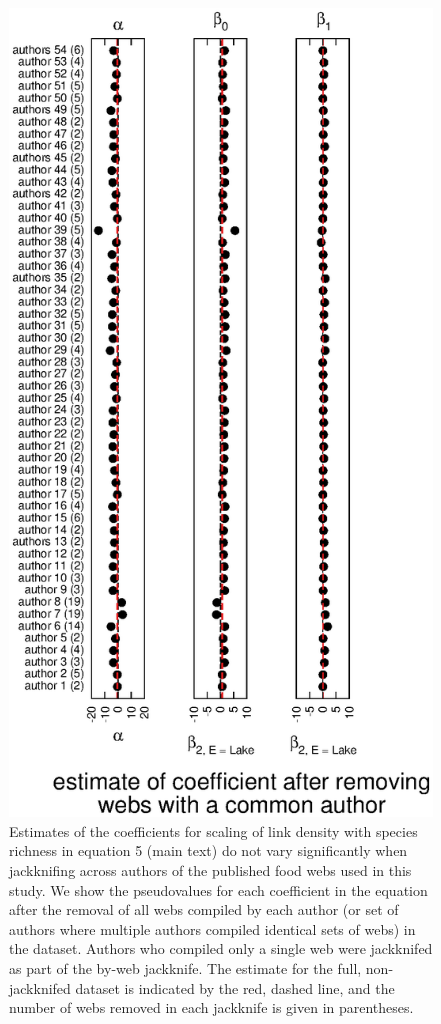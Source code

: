 \documentclass[12pt]{article}
\begin{document}
  \newpage

    \begin{figure}[!h]
    \centerline{\includegraphics*[height=.75\textheight]{Figures/Jackknife/LS_author.eps}}
    \caption{Estimates of the coefficients for scaling of link density with species richness
    in equation 5 (main text) do not vary significantly
    when jackknifing across authors of the published food webs used in this study. 
    We show the pseudovalues for each coefficient
    in the equation after the removal of all webs compiled by each author (or set of authors where
    multiple authors compiled identical sets of webs) in the dataset. Authors
    who compiled only a single web were jackknifed as part of the by-web jackknife.
    The estimate for the full, non-jackknifed dataset is indicated by the red, dashed line, and
    the number of webs removed in each jackknife is given in parentheses.}
    \label{LS_auth}
    \end{figure}
\end{document}
